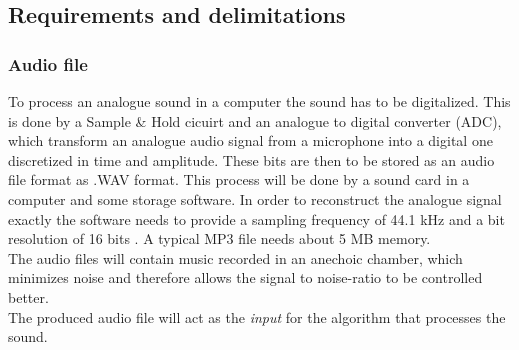         
\subsection{Requirements and delimitations}
\subsubsection{Audio file}
To process an analogue sound in a computer the sound has to be digitalized. This is done by a Sample \& Hold cicuirt and an analogue to digital converter (ADC), which transform an analogue audio signal from a microphone into a digital one discretized in time and amplitude. These bits are then to be stored as an audio file format as .WAV format. This process will be done by a sound card in a computer and some storage software. In order to reconstruct the analogue signal exactly the software needs to provide a sampling frequency of 44.1 kHz and a bit resolution of 16 bits \cite{Mic}. A typical MP3 file needs about 5 MB memory. \\
The audio files will contain music recorded in an anechoic chamber, which minimizes noise and therefore allows the signal to noise-ratio to be controlled better. \\      
The produced audio file will act as the \textit{input} for the algorithm that processes the sound. 

